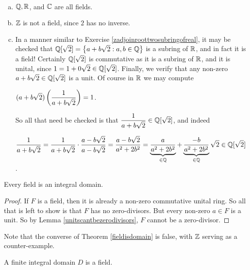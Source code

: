 \documentclass[11pt,fleqn,dvipsnames,usenames]{article}
\begin{document}
\begin{examples}~
\begin{enumerate}[(a)]
\item $\mathbb{Q}, \mathbb{R}$, and $\mathbb{C}$ are all fields.
\item $\mathbb{Z}$ is not a field, since $2$ has no inverse.
\item In a manner similar to Exercise \ref{zadjoinroottwosubringofreal}, it may be checked that $\mathbb{Q}[\sqrt{2}] = \left\{a + b\sqrt{2}:a,b\in\mathbb{Q}\right\}$ is a subring of $\mathbb{R}$, and in fact it is a field!  Certainly $\mathbb{Q}[\sqrt{2}]$ is commutative as it is a subring of $\mathbb{R}$, and it is unital, since $1 = 1 + 0\sqrt{2}\in\mathbb{Q}[\sqrt{2}]$.  Finally, we verify that any non-zero $a+b\sqrt{2}\in \mathbb{Q}[\sqrt{2}]$ is a unit.  Of course in $\mathbb{R}$ we may compute
\begin{center}
$(\displaystyle{a + b\sqrt{2})\left(\frac{1}{a + b\sqrt{2}}\right) = 1}$.
\end{center}
So all that need be checked is that $\dfrac{1}{a + b\sqrt{2}}\in \mathbb{Q}[\sqrt{2}]$, and indeed
\begin{center}
$\displaystyle{\frac{1}{a + b\sqrt{2}} = \frac{1}{a + b\sqrt{2}}\cdot\frac{a - b\sqrt{2}}{a - b\sqrt{2}} = \frac{a - b\sqrt{2}}{a^2 + 2b^2} = \underbrace{\frac{a}{a^2 + 2b^2}}_{\in\mathbb{Q}} + \underbrace{\frac{-b}{a^2 + 2b^2}}_{\in\mathbb{Q}}\sqrt{2}\in\mathbb{Q}[\sqrt{2}]}$.
\end{center}
\end{enumerate}
\end{examples}
%
\begin{theorem}\label{fieldisdomain}
Every field is an integral domain.
\end{theorem}
%
\begin{proof}
If $F$ is a field, then it is already a non-zero commutative unital ring.  So all that is left to show is that $F$ has no zero-divisors.  But every non-zero $a\in F$ is a unit.  So by Lemma \ref{unitscantbezerodivisors}, $F$ cannot be a zero-divisor.
\end{proof}
%
\begin{remark}
Note that the converse of Theorem \ref{fieldisdomain} is false, with $\mathbb{Z}$ serving as a counter-example.
\end{remark}
%
\begin{theorem}
A finite integral domain $D$ is a field.
\end{theorem}
%
\end{document}

